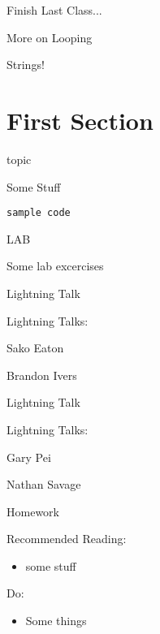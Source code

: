 \documentclass{beamer}
\begin{document}
\begin{frame}{Finish Last Class...}

  \vfill
  {\Large More on Looping}

  \vfill
  {\Large Strings!}

  \vfill

\end{frame}

\section{First Section}

\begin{frame}[fragile]{topic}

{\Large Some Stuff}

\begin{verbatim}
sample code
\end{verbatim}


\end{frame}


\begin{frame}{LAB}

\vfill
{\large Some lab excercises}
\vfill

\end{frame}


\begin{frame}{Lightning Talk}

{\LARGE Lightning Talks:}

\vfill
{\Large
 Sako Eaton

\vfill
Brandon Ivers
}
\vfill

\end{frame}


\begin{frame}{Lightning Talk}

{\LARGE Lightning Talks:}

{\Large
\vfill
Gary Pei

\vfill
Nathan Savage
}
\vfill

\end{frame}


\begin{frame}[fragile]{Homework}

Recommended Reading:
\begin{itemize}
  \item some stuff
\end{itemize}

Do:
\begin{itemize}
    \item Some things    
\end{itemize}

\end{frame}
\end{document}
